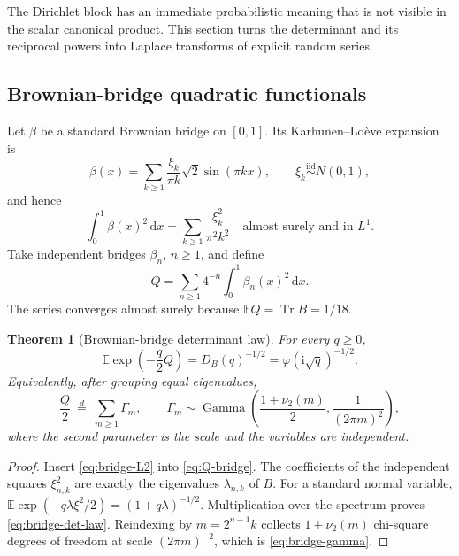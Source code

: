 \documentclass[11pt,oneside]{article}
\newtheorem{theorem}{Theorem}[section]
\theoremstyle{definition}
\newcommand{\dd}{\,\mathrm d}
\newcommand{\ii}{\mathrm i}
\newcommand{\E}{\mathbb E}
\newcommand{\Tr}{\operatorname{Tr}}
\newcommand{\vtwo}{\nu_2}
\newcommand{\phiF}{\varphi}
\begin{document}
The Dirichlet block has an immediate probabilistic meaning that is not visible in the
scalar canonical product.  This section turns the determinant and its reciprocal
powers into Laplace transforms of explicit random series.

\subsection{Brownian-bridge quadratic functionals}

Let \(\beta\) be a standard Brownian bridge on \([0,1]\).  Its Karhunen--Lo\`eve expansion is~\cite{Karhunen1947}
\begin{equation}
 \beta(x)=\sum_{k\ge1}\frac{\xi_k}{\pi k}\sqrt2\sin(\pi kx),
 \qquad \xi_k\stackrel{\mathrm{iid}}{\sim}N(0,1),
 \label{eq:bridge-KL}
\end{equation}
and hence
\begin{equation}
 \int_0^1\beta(x)^2\dd x
 =\sum_{k\ge1}\frac{\xi_k^2}{\pi^2k^2}
 \quad\text{almost surely and in }L^1.
 \label{eq:bridge-L2}
\end{equation}
Take independent bridges \(\beta_n\), \(n\ge1\), and define
\begin{equation}
 Q=\sum_{n\ge1}4^{-n}\int_0^1\beta_n(x)^2\dd x.
 \label{eq:Q-bridge}
\end{equation}
The series converges almost surely because
\(\E Q=\Tr B=1/18\).

\begin{theorem}[Brownian-bridge determinant law]
\label{thm:bridge}
For every \(q\ge0\),
\begin{equation}
 \boxed{\quad
 \E\exp\!\left(-\frac q2Q\right)=D_B(q)^{-1/2}
 =\phiF(\ii\sqrt q)^{-1/2}.
 \quad}
 \label{eq:bridge-det-law}
\end{equation}
Equivalently, after grouping equal eigenvalues,
\begin{equation}
 \frac Q2\ \stackrel{d}=\
 \sum_{m\ge1}\Gamma_m,
 \qquad
 \Gamma_m\sim\operatorname{Gamma}
 \left(\frac{1+\vtwo(m)}2,\frac1{(2\pi m)^2}\right),
 \label{eq:bridge-gamma}
\end{equation}
where the second parameter is the scale and the variables are independent.
\end{theorem}

\begin{proof}
Insert \eqref{eq:bridge-L2} into \eqref{eq:Q-bridge}.  The coefficients of the
independent squares \(\xi_{n,k}^2\) are exactly the eigenvalues
\(\lambda_{n,k}\) of \(B\).  For a standard normal variable,
\(\E\exp(-q\lambda\xi^2/2)=(1+q\lambda)^{-1/2}\).  Multiplication over the spectrum
proves \eqref{eq:bridge-det-law}.  Reindexing by \(m=2^{n-1}k\) collects
\(1+\vtwo(m)\) chi-square degrees of freedom at scale \((2\pi m)^{-2}\), which is
\eqref{eq:bridge-gamma}.
\end{proof}
\end{document}
